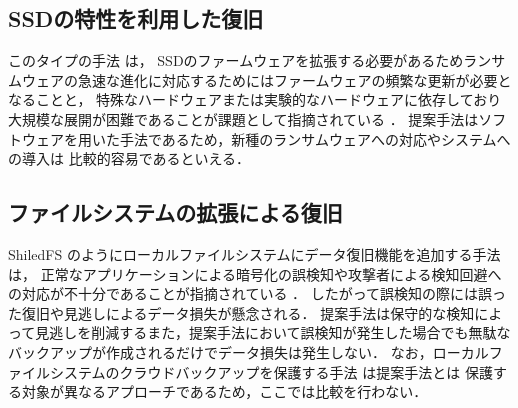 \subsection{SSDの特性を利用した復旧}
このタイプの手法 \cite{huang2017flashguard,baek2018ssd} は，
SSDのファームウェアを拡張する必要があるためランサムウェアの急速な進化に対応するためにはファームウェアの頻繁な更新が必要となることと，
特殊なハードウェアまたは実験的なハードウェアに依存しており大規模な展開が困難であることが課題として指摘されている \cite{wang2024ransom}．
提案手法はソフトウェアを用いた手法であるため，新種のランサムウェアへの対応やシステムへの導入は
比較的容易であるといえる．

\subsection{ファイルシステムの拡張による復旧}
ShiledFS \cite{shieldFS} のようにローカルファイルシステムにデータ復旧機能を追加する手法は，
正常なアプリケーションによる暗号化の誤検知や攻撃者による検知回避への対応が不十分であることが指摘されている \cite{han2020effectiveness,css2024-enomoto}．
したがって誤検知の際には誤った復旧や見逃しによるデータ損失が懸念される．
提案手法は保守的な検知によって見逃しを削減するまた，提案手法において誤検知が発生した場合でも無駄なバックアップが作成されるだけでデータ損失は発生しない．
なお，ローカルファイルシステムのクラウドバックアップを保護する手法 \cite{matos2018rockfs} は提案手法とは
保護する対象が異なるアプローチであるため，ここでは比較を行わない．
